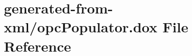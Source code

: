 \hypertarget{opcPopulator_8dox}{}\section{generated-\/from-\/xml/opc\+Populator.dox File Reference}
\label{opcPopulator_8dox}
